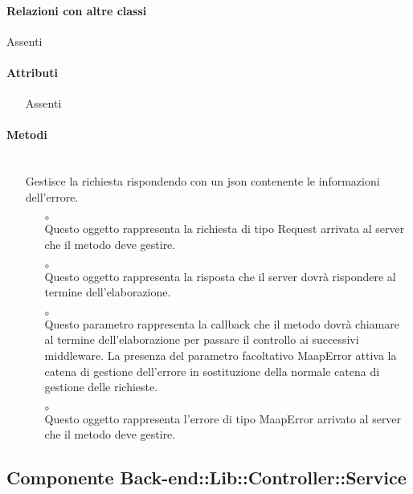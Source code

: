 \paragraph*{Relazioni con altre classi}
Assenti

\paragraph*{Attributi}
\begin{itemize}
\item[] Assenti
\end{itemize}

\paragraph*{Metodi}
\begin{itemize}
\item[]  \\ Gestisce la richiesta rispondendo con un json contenente le informazioni dell'errore.
\begin{itemize}\addtolength{\itemsep}{-0.5\baselineskip}
\item[$\circ$]  \\ Questo oggetto rappresenta la richiesta di tipo Request arrivata al server che il metodo deve gestire.
\item[$\circ$]  \\ Questo oggetto rappresenta la risposta che il server dovrà rispondere al termine dell'elaborazione.
\item[$\circ$]  \\ Questo parametro rappresenta la callback che il metodo dovrà chiamare al termine dell'elaborazione per passare il controllo ai successivi middleware. La presenza del parametro facoltativo MaapError attiva la catena di gestione dell'errore in sostituzione della normale catena di gestione delle richieste.
\item[$\circ$]  \\ Questo oggetto rappresenta l'errore di tipo MaapError arrivato al server che il metodo deve gestire.
\end{itemize}
\end{itemize}

\subsection{Componente Back-end::Lib::Controller::Service}

